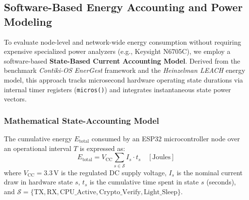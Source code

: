 \subsection{Software-Based Energy Accounting and Power Modeling}
\label{subsec:software_energy_modeling}

To evaluate node-level and network-wide energy consumption without requiring expensive specialized power analyzers (e.g., Keysight N6705C), we employ a software-based \textbf{State-Based Current Accounting Model}. Derived from the benchmark \textit{Contiki-OS EnerGest} framework and the \textit{Heinzelman LEACH} energy model, this approach tracks microsecond hardware operating state durations via internal timer registers (\texttt{micros()}) and integrates instantaneous state power vectors.

\subsubsection{Mathematical State-Accounting Model}
The cumulative energy $E_{\text{total}}$ consumed by an ESP32 microcontroller node over an operational interval $T$ is expressed as:
\begin{equation}
    E_{\text{total}} = V_{\text{CC}} \sum_{s \in \mathcal{S}} I_s \cdot t_s \quad [\text{Joules}]
\end{equation}
where $V_{\text{CC}} = 3.3\,\text{V}$ is the regulated DC supply voltage, $I_s$ is the nominal current draw in hardware state $s$, $t_s$ is the cumulative time spent in state $s$ (seconds), and $\mathcal{S} = \{\text{TX}, \text{RX}, \text{CPU\_Active}, \text{Crypto\_Verify}, \text{Light\_Sleep}\}$.

\begin{table}[htbp]
\caption{Calibrated ESP32 Operational State Parameters ($V_{\text{CC}} = 3.3\,\text{V}$)}
\label{tab_esp32_state_params}
\centering
\small
\renewcommand{\arraystretch}{1.15}
\end{table}

